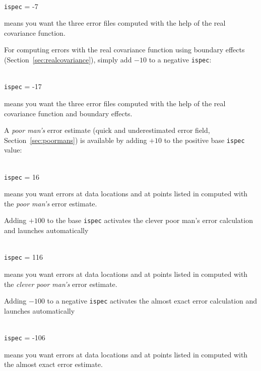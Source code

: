 \example\\
\texttt{ispec}             = -7 \qquad \begin{minipage}[t]{.7\textwidth}{means you want the three error files computed with the help of the real covariance function.}\end{minipage}


For computing errors with the real covariance function using boundary effects (Section~\ref{sec:realcovariance}), simply add $-10$ to a negative \texttt{ispec}:

\example\\
\texttt{ispec}             = -17 \qquad \begin{minipage}[t]{.7\textwidth}{means you want the three error files computed with the help of the real covariance function and boundary effects.}\end{minipage}


A \textit{poor man's} error estimate (quick and underestimated error field, Section~\ref{sec:poormans}) is available by adding $+10$ to the positive base \texttt{ispec} value:

\example\\
\texttt{ispec}             = 16 \qquad \begin{minipage}[t]{.7\textwidth}{means you want errors at data locations and at points listed in  computed with the \textit{poor man's} error estimate.}\end{minipage}



Adding $+100$ to the base \texttt{ispec} activates  the clever poor man's error calculation and launches automatically 

\example\\
\texttt{ispec}             = 116 \qquad \begin{minipage}[t]{.7\textwidth}{means you want errors at data locations and at points listed in  computed with the \textit{clever poor man's} error estimate.}\end{minipage}

Adding $-100$ to a negative \texttt{ispec} activates the almost exact error calculation and launches automatically 

\example\\
\texttt{ispec}             = -106 \qquad \begin{minipage}[t]{.7\textwidth}{means you want errors at data locations and at points listed in  computed with the almost exact error estimate.}\end{minipage}



